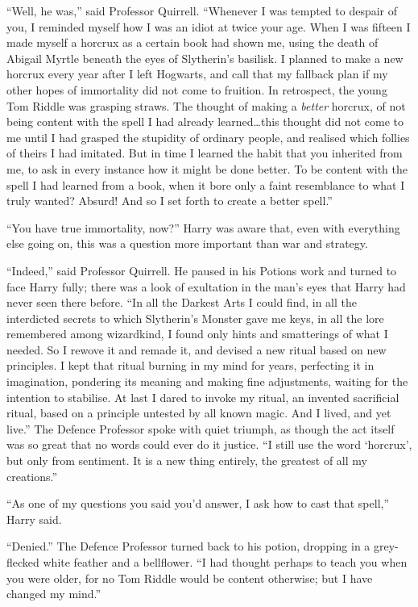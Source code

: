 “Well, he was,” said Professor Quirrell. “Whenever I was tempted to despair of
you, I reminded myself how I was an idiot at twice your age. When I was fifteen
I made myself a horcrux as a certain book had shown me, using the death of
Abigail Myrtle beneath the eyes of Slytherin’s basilisk. I planned to make a
new horcrux every year after I left Hogwarts, and call that my fallback plan if
my other hopes of immortality did not come to fruition. In retrospect, the
young Tom Riddle was grasping straws. The thought of making a \emph{better}
horcrux, of not being content with the spell I had already learned…this
thought did not come to me until I had grasped the stupidity of ordinary
people, and realised which follies of theirs I had imitated. But in time I
learned the habit that you inherited from me, to ask in every instance how it
might be done better. To be content with the spell I had learned from a book,
when it bore only a faint resemblance to what I truly wanted? Absurd! And so I
set forth to create a better spell.”

“You have true immortality, now?” Harry was aware that, even with everything
else going on, this was a question more important than war and strategy.

“Indeed,” said Professor Quirrell. He paused in his Potions work and turned to
face Harry fully; there was a look of exultation in the man’s eyes that Harry
had never seen there before. “In all the Darkest Arts I could find, in all the
interdicted secrets to which Slytherin’s Monster gave me keys, in all the lore
remembered among wizardkind, I found only hints and smatterings of what I
needed. So I rewove it and remade it, and devised a new ritual based on new
principles. I kept that ritual burning in my mind for years, perfecting it in
imagination, pondering its meaning and making fine adjustments, waiting for the
intention to stabilise. At last I dared to invoke my ritual, an invented
sacrificial ritual, based on a principle untested by all known magic. And I
lived, and yet live.” The Defence Professor spoke with quiet triumph, as though
the act itself was so great that no words could ever do it justice. “I still
use the word ‘horcrux’, but only from sentiment. It is a new thing entirely,
the greatest of all my creations.”

“As one of my questions you said you’d answer, I ask how to cast that spell,”
Harry said.

“Denied.” The Defence Professor turned back to his potion, dropping in a
grey-flecked white feather and a bellflower. “I had thought perhaps to teach
you when you were older, for no Tom Riddle would be content otherwise; but I
have changed my mind.”

